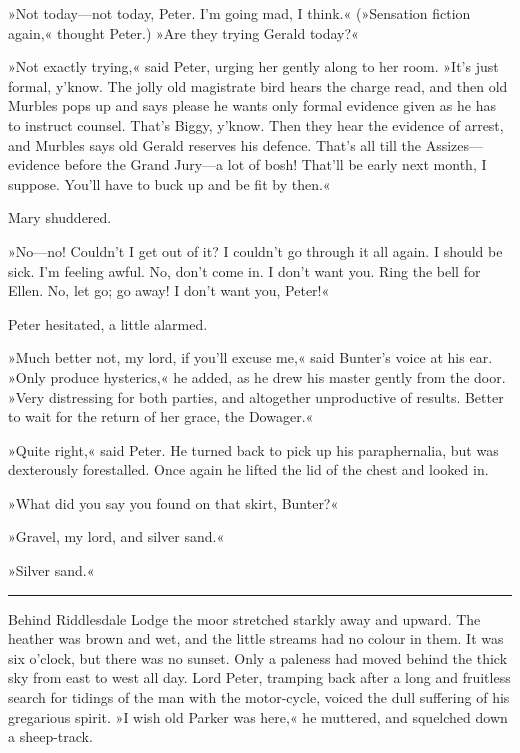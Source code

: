 »Not today\allowbreak---\allowbreak not today, Peter. I'm going mad, I think.« (»Sensation fiction again,« thought Peter.) »Are they trying Gerald today?«

»Not exactly trying,« said Peter, urging her gently along to her room.  »It's just formal, y'know. The jolly old magistrate bird hears the charge read, and then old Murbles pops up and says please he wants only formal evidence given as he has to instruct counsel. That's Biggy, y'know. Then they hear the evidence of arrest, and Murbles says old Gerald reserves his defence. That's all till the Assizes\allowbreak---\allowbreak evidence before the Grand Jury\allowbreak---\allowbreak a lot of bosh! That'll be early next month, I suppose. You'll have to buck up and be fit by then.«

Mary shuddered.

»No\allowbreak---\allowbreak no! Couldn't I get out of it? I couldn't go through it all again.  I should be sick. I'm feeling awful. No, don't come in. I don't want you. Ring the bell for Ellen. No, let go; go away! I don't want you, Peter!«

Peter hesitated, a little alarmed.

»Much better not, my lord, if you'll excuse me,« said Bunter's voice at his ear. »Only produce hysterics,« he added, as he drew his master gently from the door. »Very distressing for both parties, and altogether unproductive of results. Better to wait for the return of her grace, the Dowager.«

»Quite right,« said Peter. He turned back to pick up his paraphernalia, but was dexterously forestalled. Once again he lifted the lid of the chest and looked in.

»What did you say you found on that skirt, Bunter?«

»Gravel, my lord, and silver sand.«

»Silver sand.«

\noindent\hfil\rule{0.5\textwidth}{.4pt}\hfil

Behind Riddlesdale Lodge the moor stretched starkly away and upward.  The heather was brown and wet, and the little streams had no colour in them. It was six o'clock, but there was no sunset. Only a paleness had moved behind the thick sky from east to west all day. Lord Peter, tramping back after a long and fruitless search for tidings of the man with the motor-cycle, voiced the dull suffering of his gregarious spirit. »I wish old Parker was here,« he muttered, and squelched down a sheep-track.

